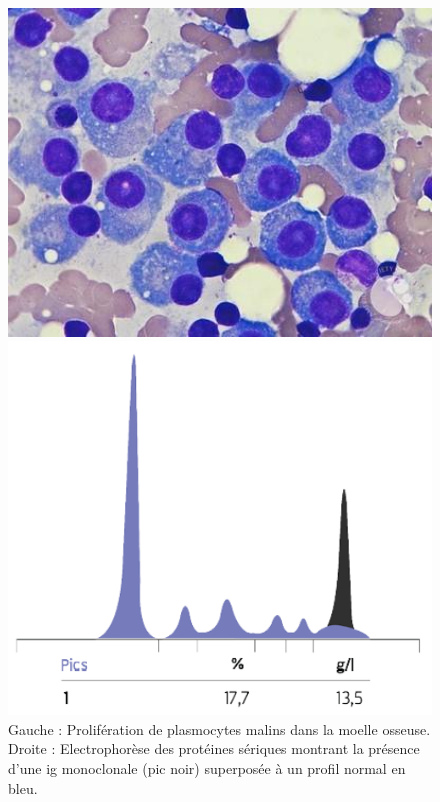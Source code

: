 \begin{figure}[H]
    \begin{minipage}{0.45\textwidth}
        \centering
        \includegraphics[width=1\textwidth]{images/mm_cells.jpeg}
    \end{minipage}
    \hfill
    \begin{minipage}{0.45\textwidth}
        \centering
        \includegraphics[width=01\textwidth]{images/pic.png}
    \end{minipage}
    \caption{Gauche : Prolifération de plasmocytes malins dans la moelle osseuse.
        Droite : Electrophorèse des protéines sériques montrant la présence d'une \gls{ig} monoclonale (pic noir)
        superposée à un profil normal en bleu.}
    \label{fig:mm-cells-ig}
\end{figure}

